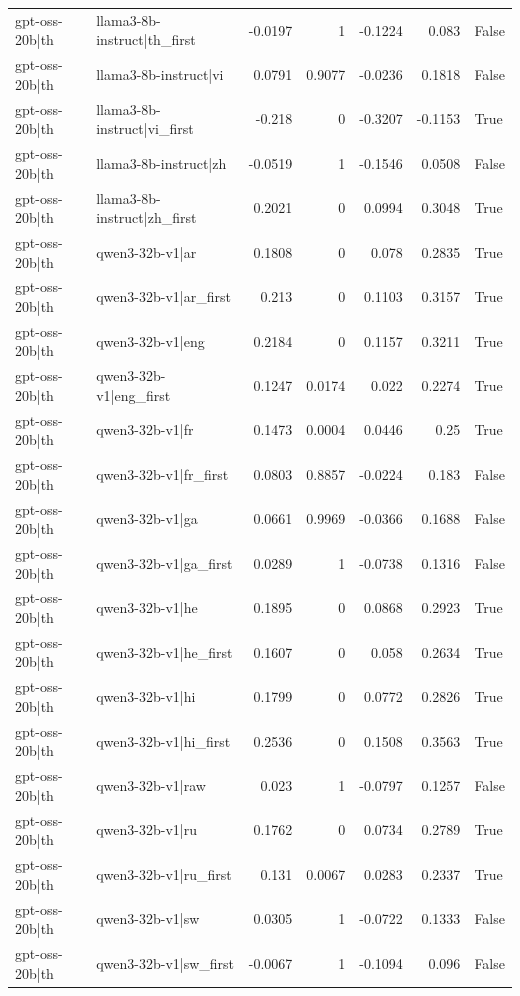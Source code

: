 \begin{table}
\begin{tabular}{l l r r r r l}
gpt-oss-20b|th & llama3-8b-instruct|th_first & -0.0197 & 1 & -0.1224 & 0.083 & False \\
gpt-oss-20b|th & llama3-8b-instruct|vi & 0.0791 & 0.9077 & -0.0236 & 0.1818 & False \\
gpt-oss-20b|th & llama3-8b-instruct|vi_first & -0.218 & 0 & -0.3207 & -0.1153 & True \\
gpt-oss-20b|th & llama3-8b-instruct|zh & -0.0519 & 1 & -0.1546 & 0.0508 & False \\
gpt-oss-20b|th & llama3-8b-instruct|zh_first & 0.2021 & 0 & 0.0994 & 0.3048 & True \\
gpt-oss-20b|th & qwen3-32b-v1|ar & 0.1808 & 0 & 0.078 & 0.2835 & True \\
gpt-oss-20b|th & qwen3-32b-v1|ar_first & 0.213 & 0 & 0.1103 & 0.3157 & True \\
gpt-oss-20b|th & qwen3-32b-v1|eng & 0.2184 & 0 & 0.1157 & 0.3211 & True \\
gpt-oss-20b|th & qwen3-32b-v1|eng_first & 0.1247 & 0.0174 & 0.022 & 0.2274 & True \\
gpt-oss-20b|th & qwen3-32b-v1|fr & 0.1473 & 0.0004 & 0.0446 & 0.25 & True \\
gpt-oss-20b|th & qwen3-32b-v1|fr_first & 0.0803 & 0.8857 & -0.0224 & 0.183 & False \\
gpt-oss-20b|th & qwen3-32b-v1|ga & 0.0661 & 0.9969 & -0.0366 & 0.1688 & False \\
gpt-oss-20b|th & qwen3-32b-v1|ga_first & 0.0289 & 1 & -0.0738 & 0.1316 & False \\
gpt-oss-20b|th & qwen3-32b-v1|he & 0.1895 & 0 & 0.0868 & 0.2923 & True \\
gpt-oss-20b|th & qwen3-32b-v1|he_first & 0.1607 & 0 & 0.058 & 0.2634 & True \\
gpt-oss-20b|th & qwen3-32b-v1|hi & 0.1799 & 0 & 0.0772 & 0.2826 & True \\
gpt-oss-20b|th & qwen3-32b-v1|hi_first & 0.2536 & 0 & 0.1508 & 0.3563 & True \\
gpt-oss-20b|th & qwen3-32b-v1|raw & 0.023 & 1 & -0.0797 & 0.1257 & False \\
gpt-oss-20b|th & qwen3-32b-v1|ru & 0.1762 & 0 & 0.0734 & 0.2789 & True \\
gpt-oss-20b|th & qwen3-32b-v1|ru_first & 0.131 & 0.0067 & 0.0283 & 0.2337 & True \\
gpt-oss-20b|th & qwen3-32b-v1|sw & 0.0305 & 1 & -0.0722 & 0.1333 & False \\
gpt-oss-20b|th & qwen3-32b-v1|sw_first & -0.0067 & 1 & -0.1094 & 0.096 & False \\

\end{tabular}
\end{table}
